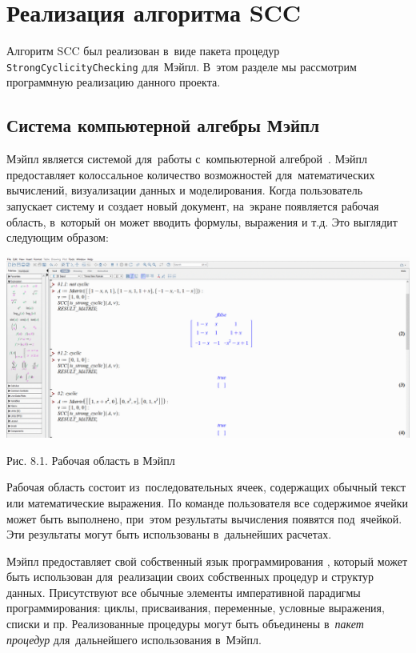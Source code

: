 \section{Реализация алгоритма SCC}

Алгоритм SCC был реализован в~виде пакета процедур \verb|StrongCyclicityChecking| для~Мэйпл.
В~этом разделе мы рассмотрим программную реализацию данного проекта.


\subsection{Система компьютерной алгебры Мэйпл}

Мэйпл является системой для~работы с~компьютерной алгеброй~\cite{litMapleHelp}.
Мэйпл предоставляет колоссальное количество возможностей для~математических вычислений, визуализации данных и моделирования.
Когда пользователь запускает систему и создает новый документ,
на~экране появляется рабочая область, в~который он может вводить формулы, выражения и т.д.
Это выглядит следующим образом:

\begin{center}
    \includegraphics[scale=0.3]{pictures/maple_workarea.png}

    \small
    Рис. 8.1. Рабочая область в Мэйпл
\end{center}

Рабочая область состоит из~последовательных ячеек, содержащих обычный текст или математические выражения.
По команде пользователя все содержимое ячейки может быть выполнено, при~этом результаты вычисления появятся под~ячейкой.
Эти результаты могут быть использованы в~дальнейших расчетах.

Мэйпл предоставляет свой собственный язык программирования \cite{litMapleGuide2021},
который может быть использован для~реализации своих собственных процедур и структур данных.
Присутствуют все обычные элементы императивной парадигмы программирования:
циклы, присваивания, переменные, условные выражения, списки и пр.
Реализованные процедуры могут быть объединены в~\emph{пакет процедур}
для~дальнейшего использования в~Мэйпл.

